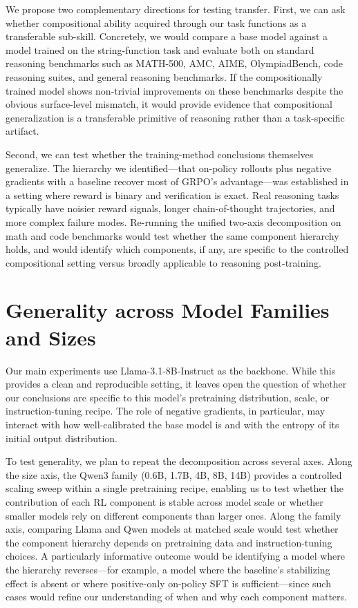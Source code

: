 \documentclass[12pt]{cmuthesis}
\begin{document}
We propose two complementary directions for testing transfer. First, we can ask whether compositional ability acquired through our task functions as a transferable sub-skill. Concretely, we would compare a base model against a model trained on the string-function task and evaluate both on standard reasoning benchmarks such as MATH-500, AMC, AIME, OlympiadBench, code reasoning suites, and general reasoning benchmarks. If the compositionally trained model shows non-trivial improvements on these benchmarks despite the obvious surface-level mismatch, it would provide evidence that compositional generalization is a transferable primitive of reasoning rather than a task-specific artifact.

Second, we can test whether the training-method conclusions themselves generalize. The hierarchy we identified---that on-policy rollouts plus negative gradients with a baseline recover most of GRPO's advantage---was established in a setting where reward is binary and verification is exact. Real reasoning tasks typically have noisier reward signals, longer chain-of-thought trajectories, and more complex failure modes. Re-running the unified two-axis decomposition on math and code benchmarks would test whether the same component hierarchy holds, and would identify which components, if any, are specific to the controlled compositional setting versus broadly applicable to reasoning post-training.

\section{Generality across Model Families and Sizes}

Our main experiments use Llama-3.1-8B-Instruct as the backbone. While this provides a clean and reproducible setting, it leaves open the question of whether our conclusions are specific to this model's pretraining distribution, scale, or instruction-tuning recipe. The role of negative gradients, in particular, may interact with how well-calibrated the base model is and with the entropy of its initial output distribution.

To test generality, we plan to repeat the decomposition across several axes. Along the size axis, the Qwen3 family (0.6B, 1.7B, 4B, 8B, 14B) provides a controlled scaling sweep within a single pretraining recipe, enabling us to test whether the contribution of each RL component is stable across model scale or whether smaller models rely on different components than larger ones. Along the family axis, comparing Llama and Qwen models at matched scale would test whether the component hierarchy depends on pretraining data and instruction-tuning choices. A particularly informative outcome would be identifying a model where the hierarchy reverses---for example, a model where the baseline's stabilizing effect is absent or where positive-only on-policy SFT is sufficient---since such cases would refine our understanding of when and why each component matters.
\end{document}
